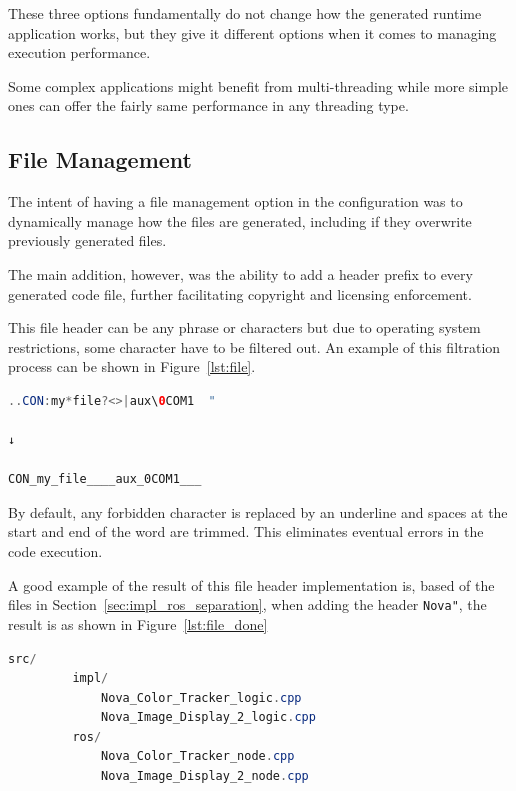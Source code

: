 These three options fundamentally do not change how the generated runtime application works, but they give it different options when it comes to managing execution performance.

\begin{tcolorbox}[colback=blue!5, colframe=blue!40!black] Some complex applications might benefit from multi-threading while more simple ones can offer the fairly same performance in any threading type.
\end{tcolorbox}


\subsection{File Management}
\label{sec:impl_file_mng}

The intent of having a file management option in the configuration was to dynamically manage how the files are generated, including if they overwrite previously generated files.

The main addition, however, was the ability to add a header prefix to every generated code file, further facilitating copyright and licensing enforcement.

This file header can be any phrase or characters but due to operating system restrictions, some character have to be filtered out. An example of this filtration process can be shown in Figure~\ref{lst:file}.

\begin{lstlisting}[language=Java, caption={File name filtering example}, label={lst:file}]
  ..CON:my*file?<>|aux\0COM1  "

↓

CON_my_file____aux_0COM1___
\end{lstlisting}

By default, any forbidden character is replaced by an underline and spaces at the start and end of the word are trimmed. This eliminates eventual errors in the code execution.

A good example of the result of this file header implementation is, based of the files in Section~\ref{sec:impl_ros_separation}, when adding the header \texttt{Nova"}, the result is as shown in Figure~\ref{lst:file_done}

\newpage

\begin{lstlisting}[language=Java, caption={File structure with header example}, label={lst:file_done}]
	src/
		 impl/
			 Nova_Color_Tracker_logic.cpp
			 Nova_Image_Display_2_logic.cpp
		 ros/
			 Nova_Color_Tracker_node.cpp
			 Nova_Image_Display_2_node.cpp
\end{lstlisting}

